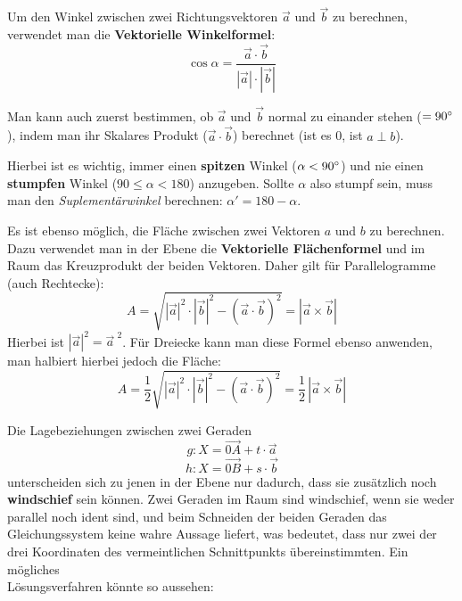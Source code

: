 \pagebreak


Um den Winkel zwischen zwei Richtungsvektoren $\vec{a}$ und $\vec{b}$ zu berechnen, verwendet man die \textbf{Vektorielle Winkelformel}:
$$ \cos \alpha = \frac{\vec{a} \cdot \vec{b}}{|\vec{a}| \cdot |\vec{b}|}$$

Man kann auch zuerst bestimmen, ob $\vec{a}$ und $\vec{b}$ normal zu einander stehen ($= 90\degree$), indem man ihr Skalares Produkt ($\vec{a} \cdot \vec{b}$) berechnet (ist es 0, ist $a \perp b$).

Hierbei ist es wichtig, immer einen \textbf{spitzen} Winkel ($\alpha < 90\degree$) und nie einen \textbf{stumpfen} Winkel ($90 \leq \alpha < 180$) anzugeben. Sollte $\alpha$ also stumpf sein, muss man den \emph{Suplement\"{a}rwinkel} berechnen: $\alpha{}' = 180 - \alpha$.


Es ist ebenso m\"{o}glich, die Fl\"{a}che zwischen zwei Vektoren $a$ und $b$ zu berechnen. Dazu verwendet man in der Ebene die \textbf{Vektorielle Fl\"{a}chenformel} und im Raum das Kreuzprodukt der beiden Vektoren. Daher gilt f\"{u}r Parallelogramme (auch Rechtecke): $$ A = \sqrt{{|\vec{a}|}^2 \cdot {|\vec{b}|}^2 - {(\vec{a} \cdot \vec{b})}^2} = |\vec{a} \times \vec{b}| $$ Hierbei ist $|\vec{a}|^2 = \vec{a}^{\,\,2}$. F\"{u}r Dreiecke kann man diese Formel ebenso anwenden, man halbiert hierbei jedoch die Fl\"{a}che: $$A = \frac{1}{2}\sqrt{{|\vec{a}|}^2 \cdot {|\vec{b}|}^2 - {(\vec{a} \cdot \vec{b})}^2} = \frac{1}{2} \, |\vec{a} \times \vec{b}|$$

\pagebreak


Die Lagebeziehungen zwischen zwei Geraden $$g: X = \vec{0A} + t \cdot \vec{a}$$ $$h: X = \vec{0B} + s \cdot \vec{b}$$ unterscheiden sich zu jenen in der Ebene nur dadurch, dass sie zus\"{a}tzlich noch \textbf{windschief} sein k\"{o}nnen. Zwei Geraden im Raum sind windschief, wenn sie weder parallel noch ident sind, und beim Schneiden der beiden Geraden das Gleichungssystem keine wahre Aussage liefert, was bedeutet, dass nur zwei der drei Koordinaten des vermeintlichen Schnittpunkts \"{u}bereinstimmten. Ein m\"{o}gliches \\ L\"{o}sungsverfahren k\"{o}nnte so aussehen:

